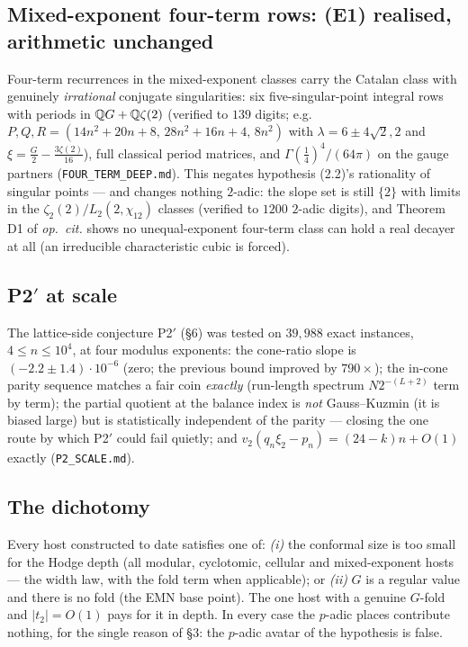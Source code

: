 \documentclass[11pt]{amsart}
\theoremstyle{remark}
\begin{document}
\subsection{Mixed-exponent four-term rows: (E1) realised, arithmetic unchanged}
Four-term recurrences in the mixed-exponent classes carry the Catalan class with genuinely \emph{irrational} conjugate singularities: six five-singular-point integral rows with periods in $\mathbb Q G+\mathbb Q\zeta(2)$ (verified to $139$ digits; e.g.\ $P,Q,R=(14n^2{+}20n{+}8,\,28n^2{+}16n{+}4,\,8n^2)$ with $\lambda=6\pm4\sqrt2,2$ and $\xi=\tfrac G2-\tfrac{3\zeta(2)}{16}$), full classical period matrices, and $\Gamma(\tfrac14)^4/(64\pi)$ on the gauge partners (\texttt{FOUR\_TERM\_DEEP.md}). This negates hypothesis (2.2)'s rationality of singular points --- and changes nothing $2$-adic: the slope set is still $\{2\}$ with limits in the $\zeta_2(2)/L_2(2,\chi_{12})$ classes (verified to $1200$ $2$-adic digits), and Theorem D1 of \emph{op.\ cit.} shows no unequal-exponent four-term class can hold a real decayer at all (an irreducible characteristic cubic is forced).

\subsection{P2$'$ at scale}
The lattice-side conjecture P2$'$ (\S6) was tested on $39{,}988$ exact instances, $4\le n\le10^4$, at four modulus exponents: the cone-ratio slope is $(-2.2\pm1.4)\cdot10^{-6}$ (zero; the previous bound improved by $790\times$); the in-cone parity sequence matches a fair coin \emph{exactly} (run-length spectrum $N2^{-(L+2)}$ term by term); the partial quotient at the balance index is \emph{not} Gauss--Kuzmin (it is biased large) but is statistically independent of the parity --- closing the one route by which P2$'$ could fail quietly; and $v_2(q_n\xi_2-p_n)=(24-k)n+O(1)$ exactly (\texttt{P2\_SCALE.md}).

\subsection{The dichotomy}
Every host constructed to date satisfies one of:
\emph{(i)} the conformal size is too small for the Hodge depth (all modular, cyclotomic, cellular and mixed-exponent hosts --- the width law, with the fold term when applicable); or
\emph{(ii)} $G$ is a regular value and there is no fold (the EMN base point). The one host with a genuine $G$-fold and $|t_2|=O(1)$ pays for it in depth. In every case the $p$-adic places contribute nothing, for the single reason of \S3: the $p$-adic avatar of the hypothesis is false.
\end{document}
